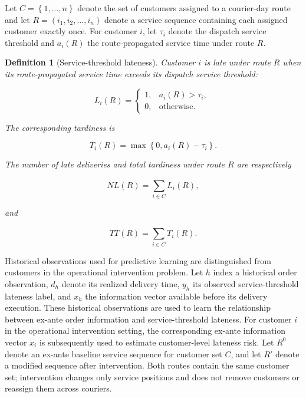 \documentclass[11pt,a4paper]{article}
\newtheorem{definition}{Definition}
\begin{document}
Let \(C = \left\{ 1,\ldots,n \right\}\) denote the set of customers
assigned to a courier-day route and let
\(R = \left( i_{1},i_{2},\ldots,i_{n} \right)\) denote a service
sequence containing each assigned customer exactly once. For customer
\(i\), let \(\tau_{i}\) denote the dispatch service threshold and
\(a_{i}(R)\) the route-propagated service time under route \(R\).

\begin{definition}[Service-threshold lateness] Customer \(i\) is late
under route \(R\) when its route-propagated service time exceeds its
dispatch service threshold:

\begin{equation}
L_{i}(R) = \left\{ \begin{matrix}
1, & a_{i}(R) > \tau_{i}, \\
0, & \text{otherwise}.
\end{matrix} \right.\
\label{eq:1}
\end{equation}

The corresponding tardiness is

\begin{equation}
T_{i}(R) = \max\left\{ 0,a_{i}(R) - \tau_{i} \right\}.
\label{eq:2}
\end{equation}

The number of late deliveries and total tardiness under route \(R\) are
respectively

\begin{equation}
NL(R) = \sum_{i \in C}^{}L_{i}(R),
\label{eq:3}
\end{equation}

and

\begin{equation}
TT(R) = \sum_{i \in C}^{}T_{i}(R).
\label{eq:4}
\end{equation}
\end{definition}

Historical observations used for predictive learning are distinguished
from customers in the operational intervention problem. Let \(h\) index
a historical order observation, \(d_{h}\) denote its realized delivery
time, \(y_{h}\) its observed service-threshold lateness label, and \(x_{h}\)
the information vector available before its delivery execution. These
historical observations are used to learn the relationship between
ex-ante order information and service-threshold lateness. For customer
\(i\) in the operational intervention setting, the corresponding ex-ante
information vector \(x_{i}\) is subsequently used to estimate
customer-level lateness risk. Let \(R^{0}\) denote an ex-ante baseline
service sequence for customer set \(C\), and let \(R'\) denote a
modified sequence after intervention. Both routes contain the same
customer set; intervention changes only service positions and does not
remove customers or reassign them across couriers.
\end{document}
